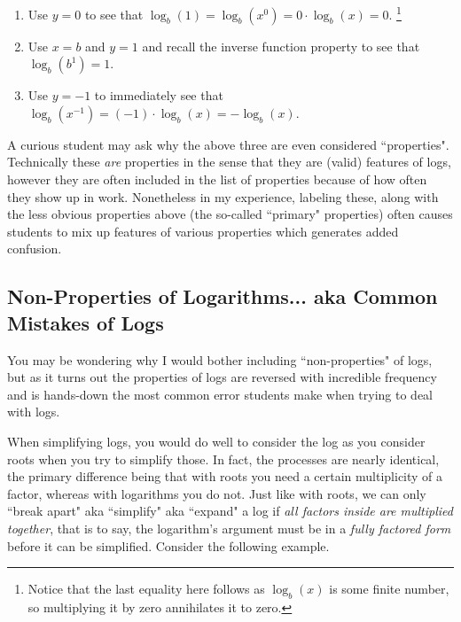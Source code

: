         \begin{enumerate}
            \item Use $y=0$ to see that $\log_b(1) = \log_b\left(x^0\right) = 0 \cdot \log_b(x) = 0$.%
            \footnote{Notice that the last equality here follows as $\log_b(x)$ is some finite number, so multiplying it by zero annihilates it to zero.}
            \item Use $x = b$ and $y = 1$ and recall the inverse function property to see that $\log_b\left(b^1\right) = 1$.
            \item Use $y = -1$ to immediately see that $\log_b\left(x^{-1}\right) = (-1)\cdot \log_b (x) = -\log_b(x)$.
        \end{enumerate}
        
        A curious student may ask why the above three are even considered ``properties". Technically these \textit{are} properties in the sense that they are (valid) features of logs, however they are often included in the list of properties because of how often they show up in work. Nonetheless in my experience, labeling these, along with the less obvious properties above (the so-called ``primary" properties) often causes students to mix up features of various properties which generates added confusion.
        
\subsection{Non-Properties of Logarithms... aka Common Mistakes of Logs}
    
    You may be wondering why I would bother including ``non-properties" of logs, but as it turns out the properties of logs are reversed with incredible frequency and is hands-down the most common error students make when trying to deal with logs.
    
    When simplifying logs, you would do well to consider the log as you consider roots when you try to simplify those. In fact, the processes are nearly identical, the primary difference being that with roots you need a certain multiplicity of a factor, whereas with logarithms you do not. Just like with roots, we can only ``break apart" aka ``simplify" aka ``expand" a log if \textit{all factors inside are multiplied together}, that is to say, the logarithm's argument must be in a \textit{fully factored form} before it can be simplified. Consider the following example.
    
